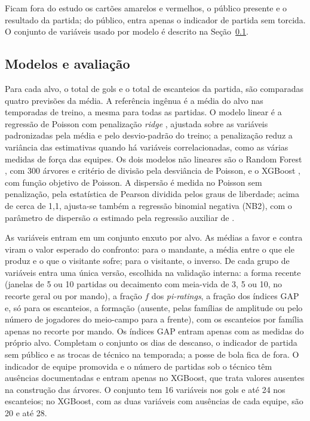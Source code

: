 Ficam fora do estudo os cartões amarelos e vermelhos, o público presente e o resultado da partida; do público, entra apenas o indicador de partida sem torcida. O conjunto de variáveis usado por modelo é descrito na Seção~\ref{subsec:Modelos}.

\subsection{Modelos e avaliação}\label{subsec:Modelos}

Para cada alvo, o total de gols e o total de escanteios da partida, são comparadas quatro previsões da média. A referência ingênua é a média do alvo nas temporadas de treino, a mesma para todas as partidas. O modelo linear é a regressão de Poisson com penalização \textit{ridge} \cite{hoerlKennard1970}, ajustada sobre as variáveis padronizadas pela média e pelo desvio-padrão do treino; a penalização reduz a variância das estimativas quando há variáveis correlacionadas, como as várias medidas de força das equipes. Os dois modelos não lineares são o Random Forest \cite{breiman2001}, com 300 árvores e critério de divisão pela desviância de Poisson, e o XGBoost \cite{chenGuestrin2016}, com função objetivo de Poisson. A dispersão é medida no Poisson sem penalização, pela estatística de Pearson dividida pelos graus de liberdade; acima de cerca de 1,1, ajusta-se também a regressão binomial negativa (NB2), com o parâmetro de dispersão $\alpha$ estimado pela regressão auxiliar de .

As variáveis entram em um conjunto enxuto por alvo. As médias a favor e contra viram o valor esperado do confronto: para o mandante, a média entre o que ele produz e o que o visitante sofre; para o visitante, o inverso. De cada grupo de variáveis entra uma única versão, escolhida na validação interna: a forma recente (janelas de 5 ou 10 partidas ou decaimento com meia-vida de 3, 5 ou 10, no recorte geral ou por mando), a fração $f$ dos \textit{pi-ratings}, a fração dos índices GAP e, só para os escanteios, a formação (ausente, pelas famílias de amplitude ou pelo número de jogadores do meio-campo para a frente), com os escanteios por família apenas no recorte por mando. Os índices GAP entram apenas com as medidas do próprio alvo. Completam o conjunto os dias de descanso, o indicador de partida sem público e as trocas de técnico na temporada; a posse de bola fica de fora. O indicador de equipe promovida e o número de partidas sob o técnico têm ausências documentadas e entram apenas no XGBoost, que trata valores ausentes na construção das árvores. O conjunto tem 16 variáveis nos gols e até 24 nos escanteios; no XGBoost, com as duas variáveis com ausências de cada equipe, são 20 e até 28.

